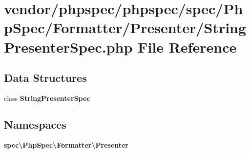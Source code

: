 \section{vendor/phpspec/phpspec/spec/\+Php\+Spec/\+Formatter/\+Presenter/\+String\+Presenter\+Spec.php File Reference}
\label{_string_presenter_spec_8php}
\subsection*{Data Structures}
\begin{DoxyCompactItemize}
\item 
class {\bf String\+Presenter\+Spec}
\end{DoxyCompactItemize}
\subsection*{Namespaces}
\begin{DoxyCompactItemize}
\item 
 {\bf spec\textbackslash{}\+Php\+Spec\textbackslash{}\+Formatter\textbackslash{}\+Presenter}
\end{DoxyCompactItemize}
